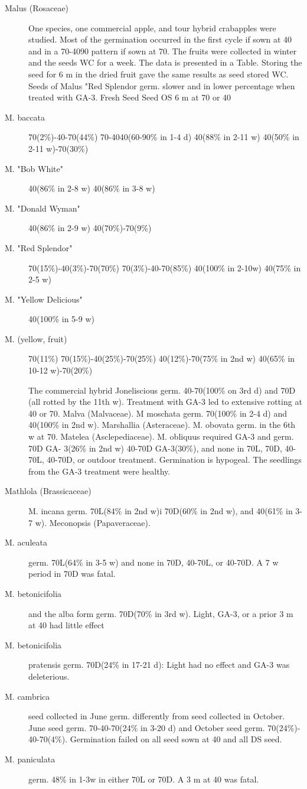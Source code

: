 \begin{description}
\item[Malus (Rosaceae)] One species, one commercial apple, and tour hybrid
crabapples were studied. Most of the germination occurred in the first cycle if sown at
40 and in a 70-4090 pattern if sown at 70. The fruits were collected in winter and the
seeds WC for a week. The data is presented in a Table. Storing the seed for 6 m in the
dried fruit gave the same results as seed stored WC. Seeds of Malus "Red Splendor
germ. slower and in lower percentage when treated with GA-3.
Fresh Seed Seed OS 6 m at 70 or 40
\item[M. baccata] 70(2\%)-40-70(44\%) 70-4040(60-90\% in 1-4 d)
40(88\% in 2-11 w) 40(50\% in 2-11 w)-70(30\%)
\item[M. "Bob White"] 40(86\% in 2-8 w) 40(86\% in 3-8 w)
\item[M. "Donald Wyman"] 40(86\% in 2-9 w) 40(70\%)-70(9\%)
\item[M. "Red Splendor"] 70(15\%)-40(3\%)-70(70\%) 70(3\%)-40-70(85\%)
40(100\% in 2-10w) 40(75\% in 2-5 w)
\item[M. "Yellow Delicious"] 40(100\% in 5-9 w)
\item[M. (yellow, fruit)] 70(11\%) 70(15\%)-40(25\%)-70(25\%)
40(12\%)-70(75\% in 2nd w) 40(65\% in 10-12 w)-70(20\%)

The commercial hybrid Joneliscious germ. 40-70(100\% on 3rd d) and 70D (all
rotted by the 11th w). Treatment with GA-3 led to extensive rotting at 40 or 70.
Malva (Malvaceae). M moschata germ. 70(100\% in 2-4 d) and 40(100\% in
2nd w). Marshallia (Asteraceae). M. obovata germ. in the 6th w at 70.
Matelea (Asclepediaceae). M. obliquus required GA-3 and germ. 70D GA-
3(26\% in 2nd w) 40-70D GA-3(30\%), and none in 70L, 70D, 40-70L, 40-70D, or
outdoor treatment. Germination is hypogeal. The seedlings from the GA-3 treatment
were healthy.

\item[Mathlola (Brassicaceae)] M. incana germ. 70L(84\% in 2nd w)i 70D(60\% in
2nd w), and 40(61\% in 3-7 w).
Meconopsis (Papaveraceae).
\item[M. aculeata] germ. 70L(64\% in 3-5 w) and none in 70D, 40-70L, or 40-70D. A 7
w period in 70D was fatal.
\item[M. betonicifolia] and the alba form germ. 70D(70\% in 3rd w). Light, GA-3, or a
prior 3 m at 40 had little effect
\item[M. betonicifolia] pratensis germ. 70D(24\% in 17-21 d): Light had no effect and
GA-3 was deleterious.
\item[M. cambrica] seed collected in June germ. differently from seed collected in
October. June seed germ. 70-40-70(24\% in 3-20 d) and October seed germ. 70(24\%)-
40-70(4\%). Germination failed on all seed sown at 40 and all DS seed.
\item[M. paniculata] germ. 48\% in 1-3w in either 70L or 70D. A 3 m at 40 was fatal.


\end{description}
